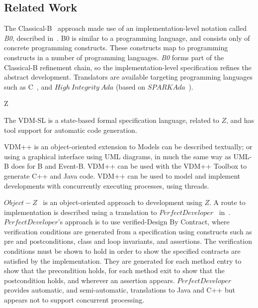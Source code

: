 \subsection{Related Work}
The Classical-B~\cite{TheBBook} approach made use of an implementation-level notation called \emph{B0}, described in~\cite{B0RefMan}. B0 is similar to a programming language, and consists only of concrete programming constructs. These constructs map to programming constructs in a number of programming languages. \emph{B0} forms part of the Classical-B refinement chain, so the implementation-level specification refines the abstract development. Translators are available targeting programming languages such as C~\cite{KernighanR88}, and $High~ Integrity~ Ada$ (based on $SPARKAda$~\cite{SPARKAda}). 

Z

The VDM-SL is a state-based formal specification language, related to $Z$, and has tool support for automatic code generation. 

VDM++ is an object-oriented extension to Models can be described textually; or using a graphical interface using UML diagrams, in much the same way as UML-B does for B and Event-B. VDM++ can be used with the VDM++ Toolbox to generate C++ and Java code. VDM++ can be used to model and implement developments with concurrently executing processes, using threads.

$Object-Z$~\cite{GSmith2000} is an object-oriented approach to development using $Z$. A route to implementation is described using a translation to $PerfectDeveloper$~\cite{PD} in~\cite{Stevens06}. $PerfectDeveloper$'s approach is to use verified-Design By Contract, where verification conditions are generated from a specification using constructs such as pre and postconditions, class and loop invariants, and assertions. The verification conditions must be shown to hold in order to show the specified contracts are satisfied by the implementation. They are generated for each method entry to show that the precondition holds, for each method exit to show that the postcondition holds, and wherever an assertion appears. $PerfectDeveloper$ provides automatic, and semi-automatic, translations to Java and C++ but appears not to support concurrent processing.

